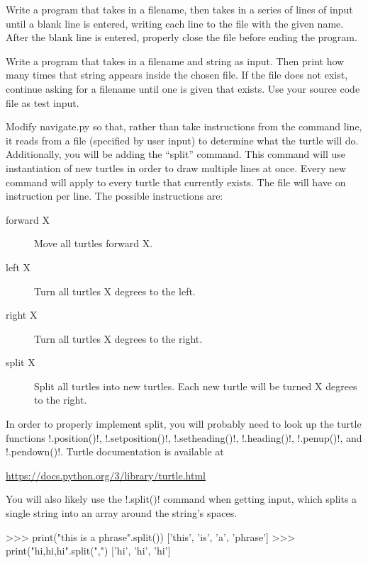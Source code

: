 \documentclass[11pt]{cselabheader}
\begin{document}
\begin{ex}[save.py] Write a program that takes in a filename, then takes in
  a series of lines of input until a blank line is entered, writing each line to
  the file with the given name. After the blank line is entered, properly close
  the file before ending the program.
\end{ex}

\begin{ex} Write a program that
  takes in a filename and string as input. Then print how many times that string
  appears inside the chosen file. If the file does not exist, continue asking
  for a filename until one is given that exists. Use your source code file as
  test input.
\end{ex}

\begin{ex}[navigate3.py] Modify navigate.py so that, rather than take instructions
    from the command line, it reads from a file (specified by user input) to
    determine what the turtle will do. Additionally, you will be adding the
    ``split'' command. This command will use instantiation of new turtles in order
    to draw multiple lines at once. Every new command will apply to every turtle
    that currently exists. The file will have on instruction per line. The
    possible instructions are:

    \begin{description}
      \item[forward X] Move all turtles forward X.
      \item[left X] Turn all turtles X degrees to the left.
      \item[right X] Turn all turtles X degrees to the right.
      \item[split X] Split all turtles into new turtles. Each new turtle will be turned X degrees to the right.
    \end{description}

    In order to properly implement split, you will probably need to look up the
turtle functions \pythoninline!.position()!, \pythoninline!.setposition()!,
    \pythoninline!.setheading()!, \pythoninline!.heading()!, \pythoninline!.penup()!, and
    \pythoninline!.pendown()!. Turtle documentation is available at
    \begin{center}
      \url{https://docs.python.org/3/library/turtle.html}
    \end{center}

    You will also likely use the \pythoninline!.split()! command when getting
    input, which splits a single string into an array around the string's
    spaces.
    \begin{pyconcode}
>>> print("this is a phrase".split())
['this', 'is', 'a', 'phrase']
>>> print("hi,hi,hi".split(",")
['hi', 'hi', 'hi']
    \end{pyconcode}


\end{ex}
\end{document}
